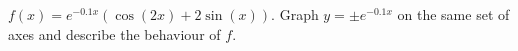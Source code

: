 {$f(x) = e^{-0.1x} \left( \cos(2x) + 2\sin(x)\right)$.  Graph $y = \pm e^{-0.1x}$ on the same set of axes and  describe the behaviour of $f$.\label{exploregraphslast}}
{}
